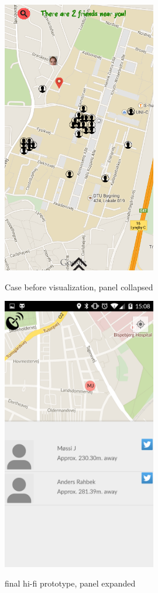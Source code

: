 \documentclass[runningheads,a4paper]{llncs}
\begin{document}
\begin{figure}
\centering
\caption{Case before visualization, panel collapsed}
\includegraphics[width=0.6\textwidth]{figures/lo-fi-5}
\label{fig:before-visualization}
\end{figure}

\begin{figure}
\centering
\caption{final hi-fi prototype, panel expanded}
\includegraphics[width=0.6\textwidth]{figures/hi-fi-friendlist-expanded}
\label{fig:hi-fi app friendlist expanded}
\end{figure}
\end{document}
